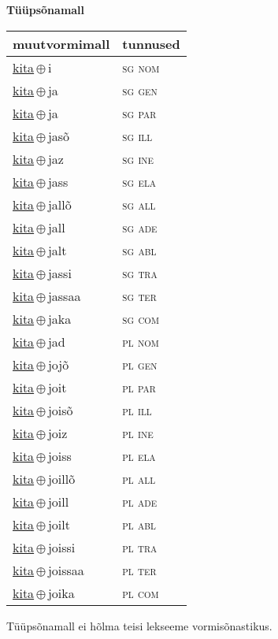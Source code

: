 

\vspace{3.5em}
\noindent \begin{minipage}{\textwidth}
\noindent \textbf{Tüüpsõnamall \,}\\

\begin{sideways}
\begin{tabular}{l l}
muutvormimall & tunnused \\
\hline
\underline{kita}\,$\oplus$\,i & \textsc{ sg nom } \\
\underline{kita}\,$\oplus$\,ja & \textsc{ sg gen } \\
\underline{kita}\,$\oplus$\,ja & \textsc{ sg par } \\
\underline{kita}\,$\oplus$\,jasõ & \textsc{ sg ill } \\
\underline{kita}\,$\oplus$\,jaz & \textsc{ sg ine } \\
\underline{kita}\,$\oplus$\,jass & \textsc{ sg ela } \\
\underline{kita}\,$\oplus$\,jallõ & \textsc{ sg all } \\
\underline{kita}\,$\oplus$\,jall & \textsc{ sg ade } \\
\underline{kita}\,$\oplus$\,jalt & \textsc{ sg abl } \\
\underline{kita}\,$\oplus$\,jassi & \textsc{ sg tra } \\
\underline{kita}\,$\oplus$\,jassaa & \textsc{ sg ter } \\
\underline{kita}\,$\oplus$\,jaka & \textsc{ sg com } \\
\underline{kita}\,$\oplus$\,jad & \textsc{ pl nom } \\
\underline{kita}\,$\oplus$\,jojõ & \textsc{ pl gen } \\
\underline{kita}\,$\oplus$\,joit & \textsc{ pl par } \\
\underline{kita}\,$\oplus$\,joisõ & \textsc{ pl ill } \\
\underline{kita}\,$\oplus$\,joiz & \textsc{ pl ine } \\
\underline{kita}\,$\oplus$\,joiss & \textsc{ pl ela } \\
\underline{kita}\,$\oplus$\,joillõ & \textsc{ pl all } \\
\underline{kita}\,$\oplus$\,joill & \textsc{ pl ade } \\
\underline{kita}\,$\oplus$\,joilt & \textsc{ pl abl } \\
\underline{kita}\,$\oplus$\,joissi & \textsc{ pl tra } \\
\underline{kita}\,$\oplus$\,joissaa & \textsc{ pl ter } \\
\underline{kita}\,$\oplus$\,joika & \textsc{ pl com } \\
\end{tabular}
\end{sideways}
\label{tab:tüüpsõnamall-kitai}

\end{minipage}

 
\vspace{1em}
\noindent Tüüpsõnamall  ei hõlma teisi lekseeme vormi\-sõnastikus.
